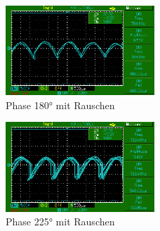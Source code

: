 \begin{figure}
    \centering
    \includegraphics[width=0.5\textwidth]{bilder/MAP011.png}
    \caption{Phase 180° mit Rauschen}        
    \label{fig:MAP011}
\end{figure}

\begin{figure}
    \centering
    \includegraphics[width=0.5\textwidth]{bilder/MAP012.png}
    \caption{Phase 225° mit Rauschen}        
    \label{fig:MAP012}
\end{figure}

